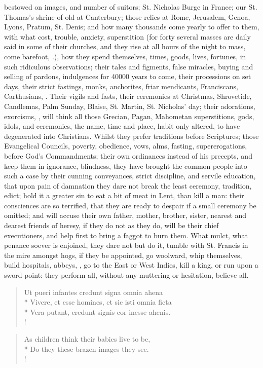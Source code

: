 {bestowed on images, and number of suitors; St. Nicholas Burge in
France; our St. Thomas's shrine of old at Canterbury; those relics at
Rome, Jerusalem, Genoa, Lyons, Pratum, St. Denis; and how many
thousands come yearly to offer to them, with what cost, trouble,
anxiety, superstition (for forty several masses are daily said in some
of their churches, and they rise at all hours of the night to
mass, come barefoot, \etc{}.), how they spend themselves, times, goods,
lives, fortunes, in such ridiculous observations; their tales and
figments, false miracles, buying and selling of pardons, indulgences
for 40\thinspace{}000 years to come, their processions on set days, their strict
fastings, monks, anchorites, friar mendicants, Franciscans,
Carthusians, \etc{}. Their vigils and fasts, their ceremonies at Christmas,
Shrovetide, Candlemas, Palm Sunday, Blaise, St. Martin, St. Nicholas'
day; their adorations, exorcisms, \etc{}, will think all those Grecian,
Pagan, Mahometan superstitions, gods, idols, and ceremonies, the name,
time and place, habit only altered, to have degenerated into
Christians. Whilst they prefer traditions before Scriptures; those
Evangelical Councils, poverty, obedience, vows, alms, fasting,
supererogations, before God's Commandments; their own ordinances
instead of his precepts, and keep them in ignorance, blindness, they
have brought the common people into such a case by their cunning
conveyances, strict discipline, and servile education, that upon pain
of damnation they dare not break the least ceremony, tradition, edict;
hold it a greater sin to eat a bit of meat in Lent, than kill a man:
their consciences are so terrified, that they are ready to despair if a
small ceremony be omitted; and will accuse their own father, mother,
brother, sister, nearest and dearest friends of heresy, if they do not
as they do, will be their chief executioners, and help first to bring a
faggot to burn them. What mulct, what penance soever is enjoined, they
dare not but do it, tumble with St. Francis in the mire amongst hogs,
if they be appointed, go woolward, whip themselves, build hospitals,
abbeys, \etc{}, go to the East or West Indies, kill a king, or run upon a
sword point: they perform all, without any muttering or hesitation,
believe all.

\begin{latin}
\begin{verse}%
Ut pueri infantes credunt signa omnia ahena\\*
Vivere, et esse homines, et sic isti omnia ficta\\*
Vera putant, credunt signis cor inesse ahenis.\\!
\end{verse}%
\end{latin}
\translationrule%
\begin{verse}
As children think their babies live to be,\\*
Do they these brazen images they see.\\!
\end{verse}

}

